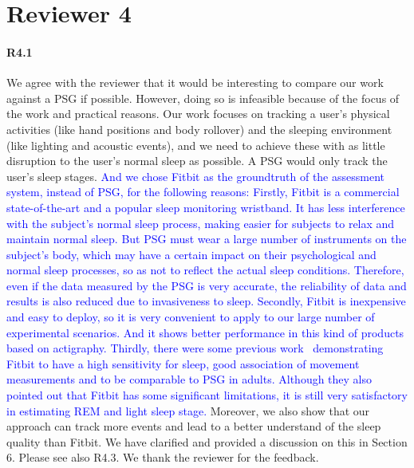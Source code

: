 \section*{Reviewer 4}

\paragraph{R4.1} We agree with the reviewer that it would be interesting to compare our work against a PSG if possible. However, doing so is infeasible because of the focus of the work and practical reasons. Our work focuses on tracking a user's physical activities (like hand positions and body rollover) and the sleeping environment (like lighting and acoustic events), and we need to achieve these with as little disruption to the user's normal sleep as possible. A PSG would only track the user's sleep stages. %
\textcolor{blue}{ And we chose Fitbit as the groundtruth of the assessment system, instead of PSG, for the following reasons: Firstly,  Fitbit is a commercial state-of-the-art and a popular sleep monitoring wristband. It has less interference with the subject's normal sleep process, making easier for subjects to relax and maintain normal sleep. But PSG  must wear a large number of instruments on the subject's body, which may have a certain impact on their psychological and normal sleep processes, so as not to reflect the actual sleep conditions. Therefore, even if the data measured by the PSG is very accurate, the reliability of data and results is also reduced due to invasiveness to sleep. Secondly, Fitbit is inexpensive and easy to deploy, so it is very convenient to apply to our large number of experimental scenarios. And it shows better performance in this kind of products based on actigraphy. Thirdly, there were some previous work~\cite{fitbit01,fitbit02,fitbit03} demonstrating Fitbit to have a high sensitivity for sleep, good association of movement measurements and to be comparable to PSG in adults. Although they also pointed out that Fitbit has some significant limitations, it is still very satisfactory in estimating REM and light sleep stage.}
Moreover, we also show that our approach can track more events and lead to a better understand of the sleep quality than Fitbit. We have clarified and provided a discussion on this in Section 6. Please see also R4.3. We thank the reviewer for the feedback.


